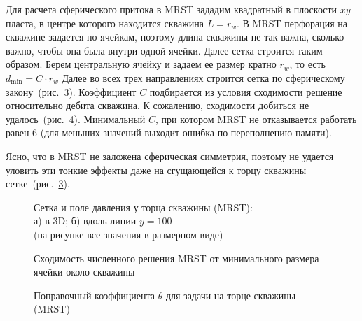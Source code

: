\documentclass{article}
\begin{document}
Для расчета сферического притока в MRST зададим квадратный в плоскости $xy$ пласта, в центре которого находится скважина $L=r_w$. В MRST перфорация на скважине задается по ячейкам, поэтому длина скважины не так важна, сколько важно, чтобы она была внутри одной ячейки. Далее сетка строится таким образом. Берем центральную ячейку и задаем ее размер кратно $r_w$, то есть $d_{\text{min}} = C \cdot r_w$ Далее во всех трех направлениях строится сетка по сферическому закону~(рис.~\ref{fig:kham_hw_outer_grid_mrst}). Коэффициент $C$ подбирается из условия сходимости решение относительно дебита скважина. К сожалению, сходимости добиться не удалось~(рис.~\ref{fig:kham_hw_outer_q_C_conv_MRST}). Минимальный $C$, при котором MRST не отказывается работать равен 6 (для меньших значений выходит ошибка по переполнению памяти).

Ясно, что в MRST не заложена сферическая симметрия, поэтому не удается уловить эти тонкие эффекты даже на сгущающейся к торцу скважины сетке~(рис.~\ref{fig:kham_hw_outer_grid_mrst}).
\begin{figure}[!ht]
\centering
\begin{subfigure}{0.48\textwidth}
\centering

\caption{}
\label{fig:kham_hw_outer_grid_mrst_3D}
\end{subfigure}
\hfill
\begin{subfigure}{0.48\textwidth}
\centering

\caption{}
\label{fig:kham_hw_outer_grid_mrst_xz}
\end{subfigure}
\caption{
Сетка и поле давления у торца скважины (MRST): \\
а) в 3D;
б) вдоль линии $y=100$ \\
(на рисунке все значения в размерном виде)
}
\label{fig:kham_hw_outer_grid_mrst}
\end{figure}

\begin{figure}[!ht]
\centering

\caption{\label{fig:kham_hw_outer_q_C_conv_MRST}Сходимость численного решения MRST от минимального размера ячейки около скважины}
\end{figure}

\begin{figure}[!ht]
\centering

\caption{Поправочный коэффициента $\theta$ для задачи на торце скважины (MRST)}
\label{fig:kham_hw_outer_theta_map_mrst}
\end{figure}
\end{document}
